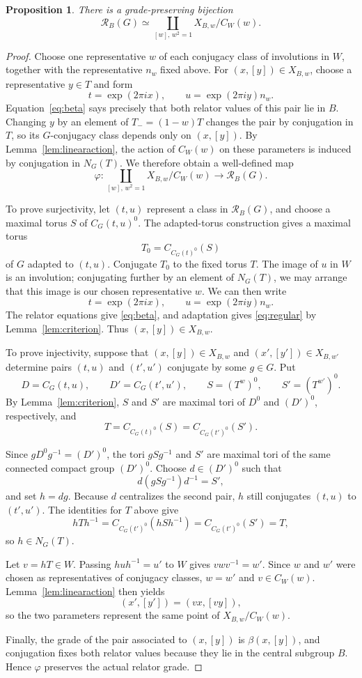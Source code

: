 \documentclass[11pt,a4paper,reqno]{amsart}
\theoremstyle{plain}
\newtheorem{proposition}[theorem]{Proposition}
\theoremstyle{definition}
\theoremstyle{remark}
\numberwithin{equation}{section}
\newcommand{\cR}{\mathcal R}
\newcommand{\eexp}[1]{\exp(2\pi i #1)}
\begin{document}
\begin{proposition}\label{prop:normalform} There is a grade-preserving bijection
\begin{equation}\label{eq:normalform}
\cR_B(G)\simeq\coprod_{[w],\,w^2=1} X_{B,w}/C_W(w).
\end{equation}
\end{proposition}
\begin{proof}
Choose one representative $w$ of each conjugacy class of involutions in $W$, together with the representative $n_w$ fixed above. For $(x,[y])\in X_{B,w}$, choose a representative $y\in T$ and form
\[
t=\eexp{x},\qquad u=\eexp{y}n_w.
\]
Equation~\eqref{eq:beta} says precisely that both relator values of this pair lie in $B$. Changing $y$ by an element of $T_-=(1-w)T$ changes the pair by conjugation in $T$, so its $G$-conjugacy class depends only on $(x,[y])$. By Lemma~\ref{lem:linearaction}, the action of $C_W(w)$ on these parameters is induced by conjugation in $N_G(T)$. We therefore obtain a well-defined map
\[
\varphi\colon \coprod_{[w],\,w^2=1}X_{B,w}/C_W(w) \longrightarrow \cR_B(G).
\]

To prove surjectivity, let $(t,u)$ represent a class in $\cR_B(G)$, and choose a maximal torus $S$ of $C_G(t,u)^0$. The adapted-torus construction gives a maximal torus
\[
T_0=C_{C_G(t)^0}(S)
\]
of $G$ adapted to $(t,u)$. Conjugate $T_0$ to the fixed torus $T$. The image of $u$ in $W$ is an involution; conjugating further by an element of $N_G(T)$, we may arrange that this image is our chosen representative $w$. We can then write
\[
t=\eexp{x},\qquad u=\eexp{y}n_w.
\]
The relator equations give \eqref{eq:beta}, and adaptation gives \eqref{eq:regular} by Lemma~\ref{lem:criterion}. Thus $(x,[y])\in X_{B,w}$.

To prove injectivity, suppose that $(x,[y])\in X_{B,w}$ and $(x',[y'])\in X_{B,w'}$ determine pairs $(t,u)$ and $(t',u')$ conjugate by some $g\in G$. Put
\[
D=C_G(t,u),\qquad D'=C_G(t',u'),\qquad S=(T^w)^0,\qquad S'=(T^{w'})^0.
\]
By Lemma~\ref{lem:criterion}, $S$ and $S'$ are maximal tori of $D^0$ and $(D')^0$, respectively, and
\[
T=C_{C_G(t)^0}(S) =C_{C_G(t')^0}(S').
\]

Since $gD^0g^{-1}=(D')^0$, the tori $gSg^{-1}$ and $S'$ are maximal tori of the same connected compact group $(D')^0$. Choose $d\in(D')^0$ such that
\[
d(gSg^{-1})d^{-1}=S',
\]
and set $h=dg$. Because $d$ centralizes the second pair, $h$ still conjugates $(t,u)$ to $(t',u')$. The identities for $T$ above give
\[
hTh^{-1} =C_{C_G(t')^0}(hSh^{-1}) =C_{C_G(t')^0}(S') =T,
\]
so $h\in N_G(T)$.

Let $v=hT\in W$. Passing $huh^{-1}=u'$ to $W$ gives $vwv^{-1}=w'$. Since $w$ and $w'$ were chosen as representatives of conjugacy classes, $w=w'$ and $v\in C_W(w)$. Lemma~\ref{lem:linearaction} then yields
\[
(x',[y'])=(vx,[vy]),
\]
so the two parameters represent the same point of $X_{B,w}/C_W(w)$.

Finally, the grade of the pair associated to $(x,[y])$ is $\beta(x,[y])$, and conjugation fixes both relator values because they lie in the central subgroup $B$. Hence $\varphi$ preserves the actual relator grade.
\end{proof}
\end{document}
